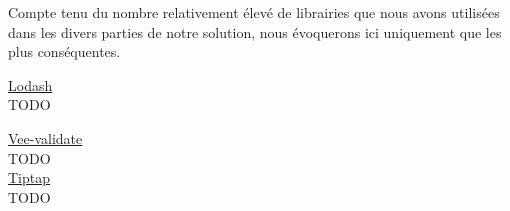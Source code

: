 Compte tenu du nombre relativement élevé de librairies que nous avons utilisées dans les divers parties de notre solution, nous évoquerons ici uniquement que les plus conséquentes. \\






\pagebreak
{}

\underline{Lodash}\\

TODO


\noindent\underline{Vee-validate}\\

TODO \\

\noindent\underline{Tiptap}\\

TODO \\

